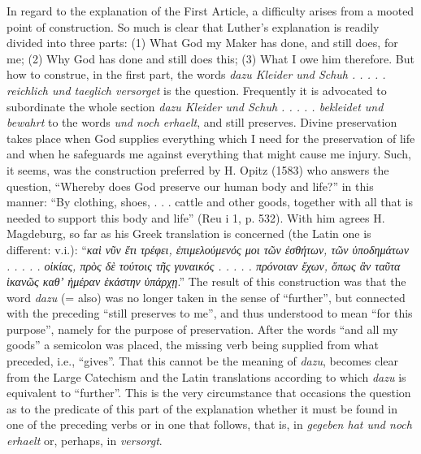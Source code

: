 In regard to the explanation of the First Article, a difficulty arises from a mooted point of construction. So much is clear that Luther’s explanation is readily divided into three parts: (1) What God my Maker has done, and still does, for me; (2) Why God has done and
still does this; (3) What I owe him therefore. But how to construe, in the first part, the words \emph{dazu Kleider und Schuh . . . . . reichlich und taeglich versorget} is the question. Frequently it is advocated to subordinate the whole section \emph{dazu Kleider und Schuh . . . . . bekleidet und bewahrt} to the words \emph{und noch erhaelt}, and still preserves. Divine preservation takes place when God supplies everything which I need for the preservation of life and when he safeguards me against everything that might cause me injury. Such, it seems, was the construction preferred by H. Opitz (1583) who answers the question, “Whereby does God preserve our human body and life?” in this manner: “By clothing, shoes, . . . cattle and other goods, together with all that is needed to support this body and life” (Reu i 1, p. 532). With him agrees H. Magdeburg, so far as his Greek translation is concerned (the Latin one is different: v.i.): “\emph{καὶ νῦν ἔτι τρέφει, ἐπιμελούμενός μοι τῶν ἐσθήτων, τῶν ὑποδημάτων . . . . . οἰκίας, πρὸς δὲ τούτοις τῆς γυναικός . . . . . πρόνοιαν ἔχων, ὅπως ἂν ταῦτα ἱκανῶς καθʼ ἡμέραν ἑκάστην ὑπάρχῃ}.” The result of this construction was that the word \emph{dazu} (= also) was no longer taken in the sense of “further”, but connected with the preceding “still preserves to me”, and thus understood to mean “for this purpose”, namely for the purpose of preservation. After the words “and all my goods” a semicolon was placed, the missing verb being supplied from what preceded, i.e., “gives”. That this cannot be the meaning of \emph{dazu}, becomes clear from the Large Catechism and the Latin translations according to which \emph{dazu} is equivalent to “further”. This is the very circumstance that occasions the question as to the predicate of this part of the explanation whether it must be found in one of the preceding verbs or in one that follows, that is, in \emph{gegeben hat und noch erhaelt} or, perhaps, in \emph{versorgt}.

